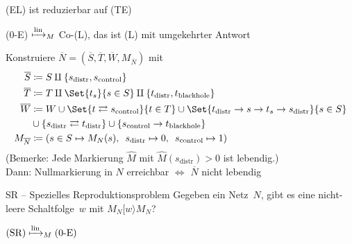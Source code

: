 \documentclass{cheat-sheet}
\newcommand{\activeTransition}[1]{[{#1}\rangle} %
\newcommand{\reducesManyOneToLin}{\xmapsto{\mathrm{lin}}_M} %
\begin{document}
\begin{satz}
  (EL) ist reduzierbar auf (TE)
\end{satz}


\begin{satz}
  (0-E) $\reducesManyOneToLin$ Co-(L), das ist (L) mit umgekehrter Antwort
\end{satz}

\begin{beweis}
  Konstruiere $\overline{N} = (\overline{S}, \overline{T}, \overline{W}, M_{\overline{N}})$ mit
  \begin{align*}
    \overline{S} & \coloneqq S \amalg \{ s_\mathrm{distr}, s_\mathrm{control} \} \\
    \overline{T} & \coloneqq T \amalg \Set{t_s}{s \in S} \amalg \{ t_\mathrm{distr}, t_\mathrm{blackhole} \} \\
    \overline{W} & \coloneqq W \cup \Set{t \rightleftarrows s_\mathrm{control}}{t \in T} \cup \Set{t_\mathrm{distr} \to s \to t_s \to s_\mathrm{distr}}{s \in S} \\
    & \cup \{ s_\mathrm{distr} \rightleftarrows t_\mathrm{distr} \} \cup \{ s_\mathrm{control} \to t_\mathrm{blackhole} \} \\
    M_{\overline{N}} & \coloneqq (s \in S \mapsto M_N(s), \enspace s_\mathrm{distr} \mapsto 0, \enspace s_\mathrm{control} \mapsto 1)
  \end{align*}
  (Bemerke: Jede Markierung $\hat{M}$ mit $\hat{M}(s_\mathrm{distr}) > 0$ ist lebendig.) \\
  Dann: Nullmarkierung in $N$ erreichbar $\iff$ $\overline{N}$ nicht lebendig
\end{beweis}

\begin{problem}{SR -- Spezielles Reproduktionsproblem}
  Gegeben ein Netz~$N$, gibt es eine nicht-leere Schaltfolge~$w$ mit $M_N \activeTransition{w} M_N$?
\end{problem}

\begin{satz}
  $\text{(SR)} \reducesManyOneToLin \text{(0-E)}$
\end{satz}
\end{document}
